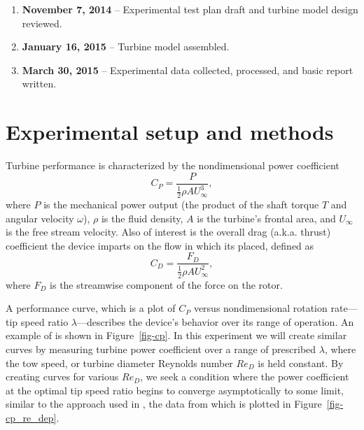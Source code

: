 \documentclass[12pt,letterpaper]{scrreprt}
\begin{document}
\begin{enumerate}

	\item \textbf{November 7, 2014} -- Experimental test plan draft and turbine
	model design reviewed.
	
	\item \textbf{January 16, 2015} -- Turbine model assembled.
	
	\item \textbf{March 30, 2015} -- Experimental data collected, processed, and
	basic report written.

\end{enumerate}


\chapter{Experimental setup and methods}

Turbine performance is characterized by the nondimensional power coefficient
\begin{equation}
C_P = \frac{P}{\frac{1}{2} \rho A U_\infty^3},
\label{eq-cp}
\end{equation}
where $P$ is the mechanical power output (the product of the shaft torque $T$
and angular velocity $\omega$), $\rho$ is the fluid density, $A$ is the
turbine's frontal area, and $U_\infty$ is the free stream velocity. Also of
interest is the overall drag (a.k.a. thrust) coefficient the device imparts on
the flow in which its placed, defined as
\begin{equation}
C_D = \frac{F_D}{\frac{1}{2} \rho A U_\infty^2},
\label{eq-cd}
\end{equation}
where $F_D$ is the streamwise component of the force on the rotor.

A performance curve, which is a plot of $C_P$ versus nondimensional rotation
rate---tip speed ratio $\lambda$---describes the device's behavior over its
range of operation. An example of is shown in Figure~\ref{fig-cp}. In this
experiment we will create similar curves by measuring turbine power coefficient
over a range of prescribed $\lambda$, where the tow speed, or turbine diameter
Reynolds number $Re_D$ is held constant. By creating curves for various $Re_D$,
we seek a condition where the power coefficient at the optimal tip speed ratio
begins to converge asymptotically to some limit, similar to the approach used in
\cite{Bachant2014}, the data from which is plotted in
Figure~\ref{fig-cp_re_dep}.
\end{document}
